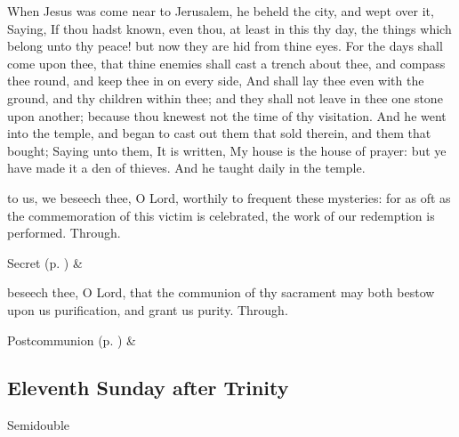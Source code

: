  When Jesus was come near to Jerusalem, he beheld the city, and wept over it, Saying, If thou hadst known, even thou, at least in this thy day, the things which belong unto thy peace! but now they are hid from thine eyes. For the days shall come upon thee, that thine enemies shall cast a trench about thee, and compass thee round, and keep thee in on every side, And shall lay thee even with the ground, and thy children within thee; and they shall not leave in thee one stone upon another; because thou knewest not the time of thy visitation. And he went into the temple, and began to cast out them that sold therein, and them that bought; Saying unto them, It is written, My house is the house of prayer: but ye have made it a den of thieves. And he taught daily in the temple.


\secret
{} to us, we beseech thee, O Lord, worthily to frequent these mysteries: for as oft as the commemoration of this victim is celebrated, the work of our redemption is performed. Through.
\begin{rubric}
     Secret  (p. \pageref{SPSaints}) \&  
\end{rubric}


\postcommunion
{} beseech thee, O Lord, that the communion of thy sacrament may both bestow upon us purification, and grant us purity. Through.


\vspace{1ex}
\begin{rubric}
     Postcommunion  (p. \pageref{SPSaints}) \&  
\end{rubric}


\clearpage
\subsection{Eleventh Sunday after Trinity}
\begin{inhead}
{Semidouble}
\end{inhead}


